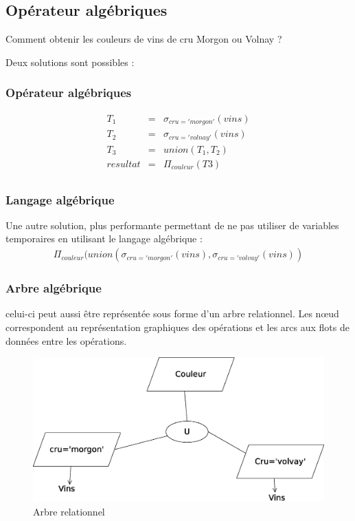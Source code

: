 \documentclass[12pt,a4paper,openany]{book}
\begin{document}
	\subsection{Opérateur algébriques}
	Comment obtenir les couleurs de vins de cru Morgon ou Volnay ? 	

	Deux solutions sont possibles : 
	\subsubsection{Opérateur algébriques}
	\begin{eqnarray*}
		T_1 &=& \sigma_{cru='morgon'}(vins)\\
		T_2 &=&  \sigma_{cru='volnay'}(vins)\\
		T_3 &=& union(T_1, T_2)\\
		resultat &=& \Pi_{couleur}(T3)\\
	\end{eqnarray*}

	\subsubsection{Langage algébrique}
	Une autre solution, plus performante permettant de ne pas utiliser de variables temporaires en utilisant le langage algébrique : 
	\begin{eqnarray*}
		\Pi_{couleur}(union(\sigma_{cru='morgon'}(vins), \sigma_{cru='volvay'}(vins))
	\end{eqnarray*}

	\subsubsection{Arbre algébrique}
	celui-ci peut aussi être représentée sous forme d'un arbre relationnel. Les n\oe{}ud correspondent au représentation graphiques des opérations et
	les arcs aux flots de données entre les opérations.
	\begin{figure}[H]
		\centering
		\includegraphics[width=15cm]{arbreRelationnel.eps}
		\caption{Arbre relationnel}
	\end{figure}

	\appendix
	
\end{document}
